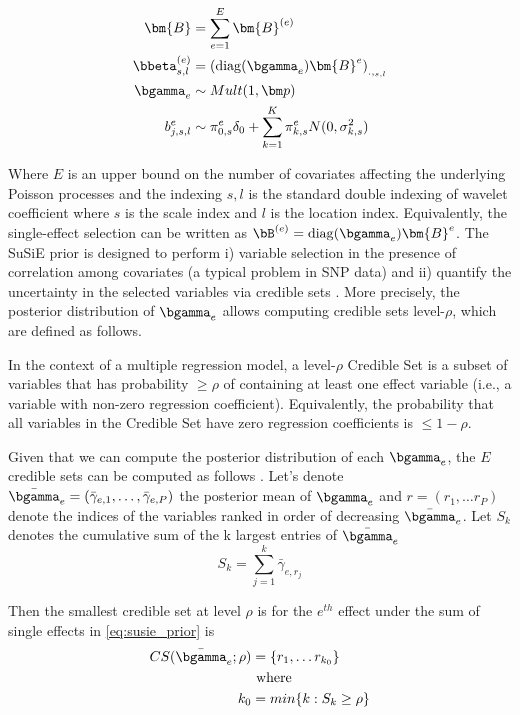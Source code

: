 \begin{align}\label{eq:susie_prior}
  \bm{B}&=  \sum_{e=1}^E \bm{B}^{(e)} \\
  \bbeta_{  s,l}^{(e)}& =  \left(\operatorname{diag}(\bgamma_e)\bm{B}^e\right)_{ . ,_{  s,l}}\\
    \bgamma_e & \sim Mult(1, \bm p)\\
   b^e_{j,s,l} &\sim  \pi^e_{0,s}\delta_0 +\sum_{k=1}^K \pi^e_{k,s} N(0,\sigma_{k,s }^2) \label{eq:ash_wav_prior}
\end{align} 

Where $E$ is an upper bound on the number of covariates affecting  the underlying Poisson processes and the indexing $s,l$ is the standard double indexing of wavelet coefficient \cite{nason_wavelet_2008} where $s$ is the scale index and $l$ is the location index. %
Equivalently, the single-effect selection can be written as $\bB^{(e)}=\operatorname{diag}(\bgamma_e)\bm{B}^e$. The SuSiE  prior is designed to  perform i) variable selection in the presence of correlation among covariates (a typical
problem in SNP data) and  ii) quantify the uncertainty in the selected variables via credible sets \citep{maller_bayesian_2012}. More precisely,  the posterior distribution of $\bgamma_e $ allows computing credible sets level-$\rho $, which are defined as follows.


 \begin{definition}
In the context of a multiple regression model, a level-$\rho $ Credible Set is  a subset of variables that
has probability   $\geq \rho$  of containing at least one effect variable (i.e., a variable with non-zero regression coefficient). Equivalently,
the probability that all variables in the Credible Set have zero regression coefficients is $\leq 1- \rho $.
\end{definition}
Given that we can compute the posterior distribution of each $\bgamma_e $, the $E$ credible sets can be computed as follows \citep{maller_bayesian_2012,wang_simple_2020}. Let's denote $ \bar{\bgamma }_e=( \bar{\gamma}_{e,1}, \ldots  , \bar{\gamma}_{e,P}) $ the posterior mean of $ \bgamma_e $  and  $r= (r_1, \ldots r_{P} ) $ denote the indices of the variables ranked in order of decreasing  $\bar{\bgamma }_e $. Let  $S_k$ denotes the cumulative sum of the k largest entries of $\bar{\bgamma }_e$
         $$ S_k= \sum_{j=1}^k\bar{ \gamma}_{e,r_j}$$ 

Then the  smallest credible set  \citep{maller_bayesian_2012} at level $\rho$ is for the $e^{th}$ effect under the sum of single effects in  \ref{eq:susie_prior} is 
\begin{align}
    CS (\bar{\bgamma}_e; \rho)&= \{r_1, \ldots r_{k_0} \} \\
    &\text{ where } \\
    k_0&= min \{k: S_k\geq\rho\}
\end{align}
 









 
 

